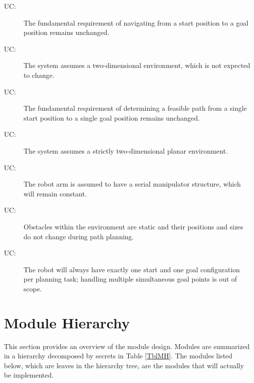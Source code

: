 \documentclass[12pt, titlepage]{article}
\newcounter{ucnum}
\newcommand{\uctheucnum}{UC\theucnum}
\begin{document}
\begin{description}
  \item[ \uctheucnum \label{uc1}:] The fundamental requirement of navigating from a start position to a goal position remains unchanged.
  \item[ \uctheucnum \label{uc2}:] The system assumes a two-dimensional environment, which is not expected to change.
  \item[ \uctheucnum \label{uc3}:] The fundamental requirement of determining a feasible path from a single start position to a single goal position remains unchanged.
  \item[ \uctheucnum \label{uc4}:] The system assumes a strictly two-dimensional planar environment.

  \item[ \uctheucnum \label{uc5}:] The robot arm is assumed to have a serial manipulator structure, which will remain constant.

  \item[ \uctheucnum \label{uc6}:] Obstacles within the environment are static and their positions and sizes do not change during path planning.

  \item[ \uctheucnum \label{uc7}:] The robot will always have exactly one start and one goal configuration per planning task; handling multiple simultaneous goal points is out of scope.
\end{description}

\section{Module Hierarchy} \label{SecMH}

This section provides an overview of the module design. Modules are summarized
in a hierarchy decomposed by secrets in Table \ref{TblMH}. The modules listed
below, which are leaves in the hierarchy tree, are the modules that will
actually be implemented.
\end{document}
